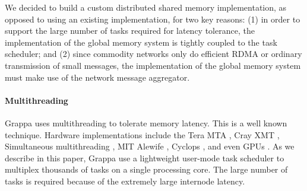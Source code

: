 We decided to build a custom distributed shared memory implementation, as
opposed to using an existing implementation, for two key reasons: (1) in order
to support the large number of tasks required for latency tolerance, the
implementation of the global memory system is tightly coupled to the task
scheduler; and (2) since commodity networks only do efficient RDMA or ordinary
transmission of small messages, the implementation of the global memory system
must make use of the network message aggregator.

% 

\paragraph{Multithreading}
Grappa uses multithreading to tolerate memory latency. This is a well known
technique. Hardware implementations include the Tera MTA \cite{tera:mta1}, Cray XMT
\cite{feo:xmt}, Simultaneous multithreading \cite{tullsen:smt}, MIT Alewife
\cite{agarwal:alewife}, Cyclops \cite{almasi:cyclops}, and even GPUs \cite{gpus}. As we
describe in this paper, Grappa use a lightweight user-mode task scheduler to
multiplex thousands of tasks on a single processing core. The large number of
tasks is required because of the extremely large internode latency.
